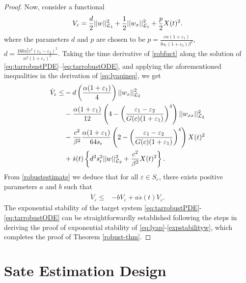 \documentclass[journal]{IEEEtran}
\begin{document}
\begin{proof}
Now, consider a functional
\begin{align}\label{robfuct} 
V_{\varepsilon} = \frac{d}{2} ||w||_{{\cal L}_1}^2 +  \frac{1}{2} ||w_{x}||_{{\cal L}_1}^2 + \frac{p}{2} X(t)^2. 
\end{align}
where the parameters $d$ and $p$ are chosen to be $p = \frac{c\alpha (1+{\varepsilon}_1)}{8 s_r (1+{\varepsilon}_2)\beta^2}$, $d =  \frac{160 s_r^2 c^2 ({\varepsilon}_1-{\varepsilon}_2)^2}{\alpha^2 (1+{\varepsilon}_1)^2}$. Taking the time derivative of  \eqref{robfuct} along the solution of \eqref{eq:tarrobustPDE}--\eqref{eq:tarrobustODE}, and applying the aforementioned inequalities in the derivation of \eqref{eq:lyapineq}, we get
\begin{align}\label{robustestimate}
\dot{V}_{\varepsilon} \leq& -d \left(\frac{\alpha (1+\varepsilon_{1})}{4}\right)  ||w_{x}||_{{\cal L}_2}^2\notag\\
&-\frac{\alpha (1+\varepsilon_{1})}{12 }  \left(4 - \left(\frac{\varepsilon_{1}-\varepsilon_{2} }{G(c) (1+\varepsilon_{1})} \right)^4 \right) ||w_{xx}||_{{\cal L}_2}^2 \notag\\
&- \frac{c^2}{\beta^2}\frac{\alpha (1+\varepsilon_{1})}{64 s_{{\mathrm r}}} \left(2 - \left(\frac{\varepsilon_{1}-\varepsilon_{2} }{G(c) (1+\varepsilon_{1})} \right)^4\right)X(t)^2\notag\\
&+\dot{s}(t) \left\{ d^2 s_{{\mathrm r}}^2 || w||_{{\cal L}_2}^2+\frac{ c^2}{\beta ^2}  X(t)^2\right\}. 
\end{align}
From  \eqref{robustestimate} we deduce  that for all $\varepsilon \in S_{\varepsilon}$, there exists positive parameters $a$ and $b$  such that
\begin{align}
\dot{V}_{\varepsilon}\leq& -b V_{\varepsilon} + a\dot{s}(t) V_{\varepsilon}. 
\end{align}
The exponential stability of the target system \eqref{eq:tarrobustPDE}-\eqref{eq:tarrobustODE} can be straightforwardly established following the steps in deriving the proof of exponential  stability of  \eqref{eq:lyap}-\eqref{expstabilityw}, which completes the proof of Theorem \ref{robust-thm}. 
\end{proof}

\section{Sate Estimation Design}\label{sec:estimation}
\end{document}

